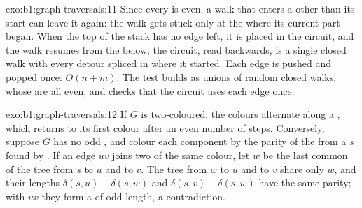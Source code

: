 \begin{solution}{exo:b1:graph-traversals:11}
Since every  is even, a walk that enters a  other than its start can leave it again: the walk gets stuck
only at the  where its current part began. When the top of the stack has no edge left, it is placed in the
circuit, and the walk resumes from the  below; the circuit, read backwards, is a single closed walk with every
detour spliced in where it started. Each edge is pushed and popped once: $O(n + m)$. The test builds  as unions
of random closed walks, whose  are all even, and checks that the circuit uses each edge once.
\end{solution}

\begin{solution}{exo:b1:graph-traversals:12}
If $G$ is two-coloured, the colours alternate along a , which returns to its first colour after an even number of
steps. Conversely, suppose $G$ has no odd , and colour each component by the parity of the  from a 
$s$ found by . If an edge $u v$ joins two  of the same colour, let $w$ be the last common
 of the tree  from $s$ to $u$ and to $v$. The tree  from $w$ to $u$ and to $v$ share only $w$, and their
lengths $\delta(s, u) - \delta(s, w)$ and $\delta(s, v) - \delta(s, w)$ have the same parity; with $u v$ they form a
 of odd length, a contradiction.
\end{solution}

